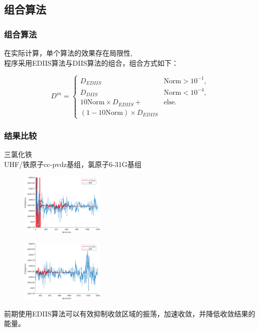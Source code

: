 \documentclass[10pt,aspectratio=43,mathserif,UTF8]{beamer}
\begin{document}
\subsection{组合算法}
\begin{frame}
	\frametitle{组合算法}
	在实际计算，单个算法的效果存在局限性,\\
	程序采用EDIIS算法与DIIS算法的组合，组合方式如下：
	
	\begin{equation}
		D^{in}=
		\begin{cases}
			D_{EDIIS}&\text{Norm}> 10^{-1},\\
			D_{DIIS}&\text{Norm}< 10^{-4},\\
			10\text{Norm} \times {D_{EDIIS}} + &\text{else}.\\
			\left( {1 - 10\text{Norm}} \right) \times {D_{EDIIS}}
		\end{cases}
	\end{equation}

	
\end{frame}


\begin{frame}
	\frametitle{结果比较}
	三氯化铁\\
	UHF/铁原子cc-pvdz基组，氯原子6-31G基组
	\begin{figure}[ht!]
		\centering
		\begin{minipage}{0.4\linewidth}
			\centering
			\includegraphics[height=3cm]{figure/FeCl3/E3.png}
			\label{fig:FeCl3:E}
		\end{minipage}
		\begin{minipage}{0.4\linewidth}
			\centering
			\includegraphics[height=3cm]{figure/FeCl3/FD3.png}
			\label{fig:FeCl3:FD}
		\end{minipage}
	\end{figure}
	前期使用EDIIS算法可以有效抑制收敛区域的振荡，加速收敛，并降低收敛结果的能量。
\end{frame}
\end{document}
